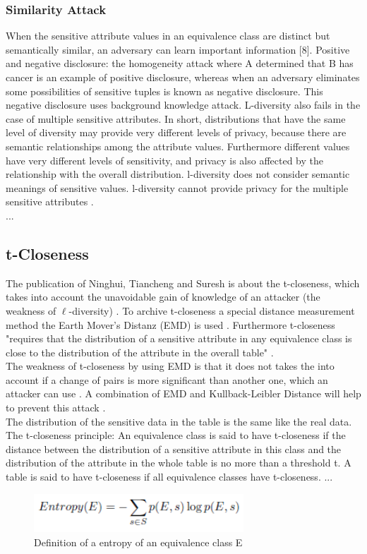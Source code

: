 \documentclass{llncs}
\begin{document}
\subsubsection{Similarity Attack} 
When the sensitive attribute values in an equivalence class are distinct but semantically similar, an adversary can learn important information [8]. Positive and negative disclosure: the homogeneity attack where A determined that B has cancer is an example of positive disclosure, whereas when an adversary eliminates some possibilities of sensitive tuples is known as negative disclosure. This negative disclosure uses background knowledge attack. L-diversity also fails in the case of multiple sensitive attributes. In short, distributions that have the same level of diversity may provide very different levels of privacy, because there are semantic relationships among the attribute values. Furthermore different values have very different levels of sensitivity, and  privacy is also affected by the relationship with the overall distribution. l-diversity does not consider semantic meanings of sensitive values. l-diversity cannot provide privacy for the multiple sensitive attributes \cite{ldiversity}.
\\...
\subsection{t-Closeness}
The publication of Ninghui, Tiancheng and Suresh is about the t-closeness, which takes into account the unavoidable gain of knowledge of an attacker (the weakness of $\ell$-diversity) \cite{li2007t}. To archive t-closeness a special distance measurement method the Earth Mover's Distanz (EMD) is used \cite{rubner2000earth}. Furthermore t-closeness "requires that the distribution of a sensitive attribute in any equivalence class is close to the distribution of the attribute in the overall table" \cite{li2007t}.\\
 
The weakness of t-closeness by using EMD is that it does not takes the into account if a change of pairs is more significant than another one, which an attacker can use \cite{li2007t}. A combination of EMD and Kullback-Leibler Distance \cite{kullback1951} will help to prevent this attack \cite{li2007t}.
\\

The distribution of the sensitive data in the table is the same like the real data\cite{li2007t}. The t-closeness principle: An equivalence class is said to have t-closeness if the distance between the distribution of a sensitive attribute in this class and the distribution of the attribute in the whole table is no more than a threshold t. A table is said to have t-closeness if all equivalence classes have t-closeness\cite{li2007t}.
...
\begin{figure}[h]
	\centering
	\includegraphics[width=0.7\textwidth]{entropy.png}
	\caption{Definition of a entropy of an equivalence class E}%
\end{figure}
\newpage


\end{document}
